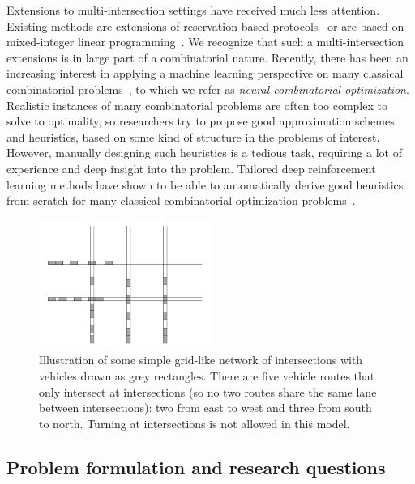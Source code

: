 \documentclass{article}
\theoremstyle{definition}
\theoremstyle{plain}
\begin{document}
Extensions to multi-intersection settings have received much less attention.
Existing methods are extensions of reservation-based
protocols~\cite{hausknechtAutonomousIntersectionManagement} or are based on
mixed-integer linear programming~\cite{sartorCombinatorialLearningTraffic2019}.
We recognize that such a multi-intersection extensions is in large part of a
combinatorial nature. Recently, there has been an increasing interest in
applying a machine learning perspective on many classical combinatorial
problems~\cite{bengioMachineLearningCombinatorial2020}, to which we refer as
\textit{neural combinatorial optimization}. Realistic instances of many
combinatorial problems are often too complex to solve to optimality, so
researchers try to propose good approximation schemes and heuristics, based on
some kind of structure in the problems of interest. However, manually designing
such heuristics is a tedious task, requiring a lot of experience and deep
insight into the problem. Tailored deep reinforcement learning methods have
shown to be able to automatically derive good heuristics from scratch for many
classical combinatorial optimization
problems~\cite{mazyavkinaReinforcementLearningCombinatorial2020}.

\begin{figure}[t]
  \centering
  \includegraphics[width=0.5\textwidth]{figures/state_example.png}
  \caption{Illustration of some simple grid-like network of intersections
    with vehicles drawn as grey rectangles. There are five vehicle routes that
    only intersect at intersections (so no two routes share the same lane
    between intersections): two from east to west and three from south to north.
    Turning at intersections is not allowed in this
    model.}\label{fig:network_illustration}
\end{figure}

\subsection{Problem formulation and research questions}
\end{document}

